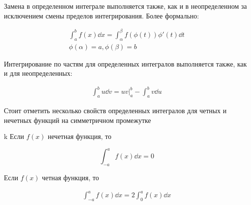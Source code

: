 
Замена в определенном интеграле выполняется также, как и в неопределенном за
исключением смены пределов интегрирования. Более формально:

\begin{align*}
  \int_{a}^{b} f(x) \dd x = \int_{\alpha}^{\beta} f(\phi(t)) \phi'(t) \dd t \\
  \phi(\alpha) = a, \phi(\beta) = b
\end{align*}

Интегрирование по частям для определенных интегралов выполняется также, как и
для неопределенных:

\begin{align*}
  \int_{a}^{b} u \dd v = u v \bigg\vert_{a}^{b} - \int_{a}^{b} v \dd u
\end{align*}

Стоит отметить несколько свойств определенных интегралов для четных и нечетных
функций на симметричном промежутке

\begin{multicols}{2}
  \begin{lemma}k
    Если \(f(x)\) нечетная функция, то

    \begin{equation*}
      \int_{-a}^{a} f(x) \dd x = 0
    \end{equation*}
  \end{lemma}
  
  \begin{lemma}
    Если \(f(x)\) четная функция, то
    
    \begin{align*}
      \int_{-a}^{a} f(x) \dd x = 2 \int_{0}^{a} f(x) \dd x
    \end{align*}
  \end{lemma}  
\end{multicols}

